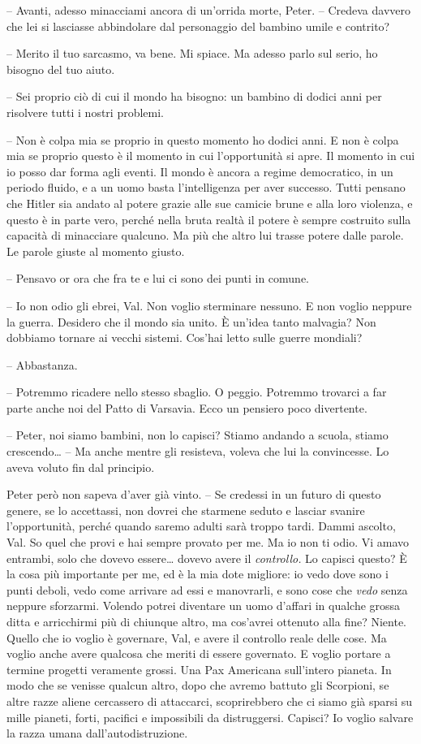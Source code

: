 {-- Avanti, adesso minacciami ancora di un'orrida morte, Peter. --
	Credeva davvero che lei si lasciasse abbindolare dal personaggio del
	bambino umile e contrito?}

{-- Merito il tuo sarcasmo, va bene. Mi spiace. Ma adesso parlo sul
	serio, ho bisogno del tuo aiuto.}

{-- Sei proprio ciò di cui il mondo ha bisogno: un bambino di dodici
	anni per risolvere tutti i nostri problemi.}

{-- Non è colpa mia se proprio in questo momento ho dodici anni. E non è
	colpa mia se proprio questo è il momento in cui l'opportunità si apre.
	Il momento in cui io posso dar forma agli eventi. Il mondo è ancora a
	regime democratico, in un periodo fluido, e a un uomo basta
	l'intelligenza per aver successo. Tutti pensano che Hitler sia andato al
	potere grazie alle sue camicie brune e alla loro violenza, e questo è in
	parte vero, perché nella bruta realtà il potere è sempre costruito sulla
	capacità di minacciare qualcuno. Ma più che altro lui trasse potere
	dalle parole. Le parole giuste al momento giusto.}

{-- Pensavo or ora che fra te e lui ci sono dei punti in comune.}

{-- Io non odio gli ebrei, Val. Non voglio sterminare nessuno. E non
	voglio neppure la guerra. Desidero che il mondo sia unito. È un'idea
	tanto malvagia? Non dobbiamo tornare ai vecchi sistemi. Cos'hai letto
	sulle guerre mondiali?}

{-- Abbastanza.}

{-- Potremmo ricadere nello stesso sbaglio. O peggio. Potremmo trovarci
	a far parte anche noi del Patto di Varsavia. Ecco un pensiero poco
	divertente.}

{-- Peter, noi siamo bambini, non lo capisci? Stiamo andando a scuola,
	stiamo crescendo\ldots{} -- Ma anche mentre gli resisteva, voleva che
	lui la convincesse. Lo aveva voluto fin dal principio.}

{Peter però non sapeva d'aver già vinto. -- Se credessi in un futuro di
	questo genere, se lo accettassi, non dovrei che starmene seduto e
	lasciar svanire l'opportunità, perché quando saremo adulti sarà troppo
	tardi. Dammi ascolto, Val. So quel che provi e hai sempre provato per
	me. Ma io non ti odio. Vi amavo entrambi, solo che dovevo essere\ldots{}
	dovevo avere il \emph{controllo.} Lo capisci questo? È la cosa più
	importante per me, ed è la mia dote migliore: io vedo dove sono i punti
	deboli, vedo come arrivare ad essi e manovrarli, e sono cose che
	\emph{vedo} senza neppure sforzarmi. Volendo potrei diventare un uomo
	d'affari in qualche grossa ditta e arricchirmi più di chiunque altro, ma
	cos'avrei ottenuto alla fine? Niente. Quello che io voglio è governare,
	Val, e avere il controllo reale delle cose. Ma voglio anche avere
	qualcosa che meriti di essere governato. E voglio portare a termine
	progetti veramente grossi. Una Pax Americana sull'intero pianeta. In
	modo che se venisse qualcun altro, dopo che avremo battuto gli
	Scorpioni, se altre razze aliene cercassero di attaccarci, scoprirebbero
	che ci siamo già sparsi su mille pianeti, forti, pacifici e impossibili
	da distruggersi. Capisci? Io voglio salvare la razza umana
	dall'autodistruzione.}

